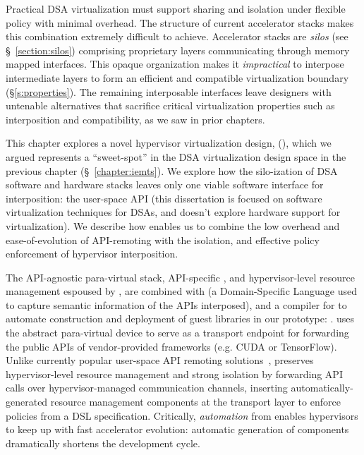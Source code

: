 
Practical DSA virtualization must support sharing and isolation under flexible
policy with minimal overhead. The structure of current accelerator stacks
makes this combination extremely difficult to achieve.
Accelerator stacks are \emph{silos} (see \S~\ref{section:silos}) comprising
proprietary layers communicating through memory mapped interfaces.
This opaque organization makes it \emph{impractical} to interpose intermediate
layers to form an efficient and compatible virtualization boundary
(\S\ref{s:properties}). The remaining interposable interfaces leave designers
with untenable alternatives that sacrifice critical virtualization properties
such as interposition and compatibility, as we saw in prior chapters.

This chapter explores a novel hypervisor virtualization design, \hirafull
(\hira), which we argued represents a ``sweet-spot'' in the DSA virtualization
design space in the previous chapter (\S~\ref{chapter:iemts}). We explore how
the silo-ization of DSA software and hardware stacks leaves only one viable
software interface for interposition: the user-space API (this dissertation is
focused on software virtualization techniques for DSAs, and doesn't explore
hardware support for virtualization). We describe how \hira enables us to
combine the low overhead and ease-of-evolution of API-remoting with the
isolation, and effective policy enforcement of hypervisor interposition.

The API-agnostic para-virtual stack, API-specific \workers, and
hypervisor-level resource management espoused by \hira, are combined with
\lapis (a Domain-Specific Language used to capture semantic information of the
APIs interposed), and a compiler for \lapis to automate construction and
deployment of guest libraries in our prototype: \AvA. \AvA uses the abstract
para-virtual device to serve as a transport endpoint for forwarding the public
APIs of vendor-provided frameworks (e.g. CUDA or TensorFlow). Unlike currently
popular user-space API remoting solutions~\cite{bitfusion,xaas,vmCUDA,rCUDA,
cu2rcu}, \AvA preserves hypervisor-level resource management and strong
isolation by forwarding API calls over hypervisor-managed communication
channels, inserting au\-to\-ma\-tically-generated resource management
components at the transport layer to enforce policies from a DSL
specification. Critically, \emph{automation} from \AvA enables hypervisors
to keep up with fast accelerator evolution: automatic generation of components
dramatically shortens the development cycle.

